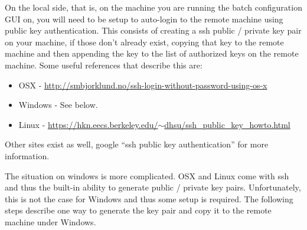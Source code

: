 \documentclass[11pt]{amsart}
\begin{document}
On the local side, that is, on the machine you are running the batch configuration GUI on, you will need to be setup to auto-login to the remote machine using public key authentication. This consists of creating a ssh public / private key pair on your machine, if those don't already exist, copying that key to the remote machine and then appending the key to the list of authorized keys on the remote machine. Some useful references that describe this are:

\begin{itemize}
\item OSX - \href{http://smbjorklund.no/ssh-login-without-password-using-os-x}{http://smbjorklund.no/ssh-login-without-password-using-os-x}
\item Windows - See below.
\item Linux - \href{https://hkn.eecs.berkeley.edu/~dhsu/ssh_public_key_howto.html}{https://hkn.eecs.berkeley.edu/$\sim$dhsu/ssh\_public\_key\_howto.html}
\end{itemize}

\noindent
Other sites exist as well,  google ``ssh public key authentication'' for more information.

The situation on windows is more complicated. OSX and Linux come with ssh and thus the built-in ability to generate public / private key pairs. Unfortunately, this is not the case for Windows and thus some setup is required. The following steps describe one way to generate the key pair and copy it to the remote machine under Windows.
\end{document}
